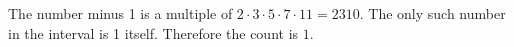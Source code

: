 The number minus 1 is a multiple of $2\cdot3\cdot5\cdot7\cdot11=2310$. The only such number in the interval is 1 itself. Therefore the count is $\boxed1$.
